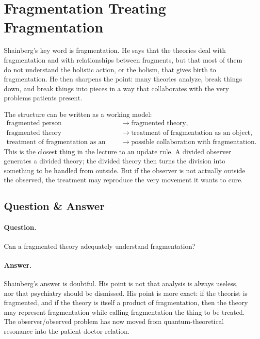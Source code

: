 \section{Fragmentation Treating Fragmentation}

Shainberg's key word is fragmentation. He says that the theories deal with fragmentation and with relationships between fragments, but that most of them do not understand the holistic action, or the holism, that gives birth to fragmentation. He then sharpens the point: many theories analyze, break things down, and break things into pieces in a way that collaborates with the very problems patients present.

The structure can be written as a working model:
\begin{align}
\text{fragmented person}
&\longrightarrow
\text{fragmented theory},\\
\text{fragmented theory}
&\longrightarrow
\text{treatment of fragmentation as an object},\\
\text{treatment of fragmentation as an object}
&\longrightarrow
\text{possible collaboration with fragmentation}.
\end{align}
This is the closest thing in the lecture to an update rule. A divided observer generates a divided theory; the divided theory then turns the division into something to be handled from outside. But if the observer is not actually outside the observed, the treatment may reproduce the very movement it wants to cure.

\subsection{Question \& Answer}

\paragraph{Question.}
Can a fragmented theory adequately understand fragmentation?

\paragraph{Answer.}
Shainberg's answer is doubtful. His point is not that analysis is always useless, nor that psychiatry should be dismissed. His point is more exact: if the theorist is fragmented, and if the theory is itself a product of fragmentation, then the theory may represent fragmentation while calling fragmentation the thing to be treated. The observer/observed problem has now moved from quantum-theoretical resonance into the patient-doctor relation.

